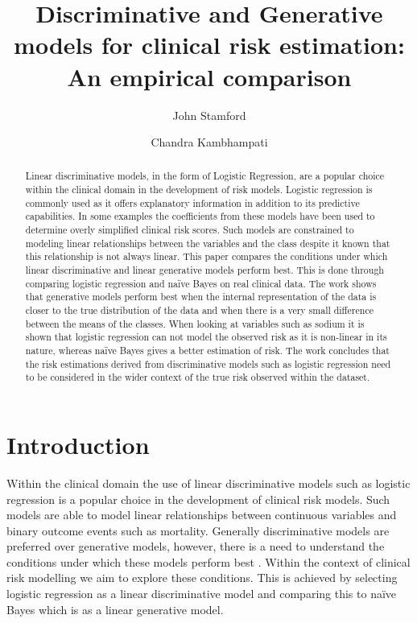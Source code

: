\documentclass[a4paper,UKenglish]{oasics-v2016}
\title{Discriminative and Generative models for clinical risk estimation: An empirical comparison}
\author[1]{John Stamford}
\author[2]{Chandra Kambhampati}
\affil[1]{Department of Computer Science, The University of Hull, Kingston upon Hull, HU6 7RX\\
\texttt{j.stamford@2014.hull.ac.uk}}
\affil[2]{Department of Computer Science, The University of Hull, Kingston upon Hull, HU6 7RX\\
\texttt{c.kambhampati@hull.ac.uk}}
\begin{document}
\maketitle

\begin{abstract}
Linear discriminative models, in the form of Logistic Regression, are a popular choice within the clinical domain in the development of risk models. Logistic regression is commonly used as it offers explanatory information in addition to its predictive capabilities. In some examples the coefficients from these models have been used to determine overly simplified clinical risk scores. Such models are constrained to modeling linear relationships between the variables and the class despite it known that this relationship is not always linear. This paper compares the conditions under which linear discriminative and linear generative models perform best. This is done through comparing logistic regression and naïve Bayes on real clinical data. The work shows that generative models perform best when the internal representation of the data is closer to the true distribution of the data and when there is a very small difference between the means of the classes. When looking at variables such as sodium it is shown that logistic regression can not model the observed risk as it is non-linear in its nature, whereas naïve Bayes gives a better estimation of risk. The work concludes that the risk estimations derived from discriminative models such as logistic regression need to be considered in the wider context of the true risk observed within the dataset.
 \end{abstract}



\section{Introduction}
Within the clinical domain the use of linear discriminative models such as logistic regression is a popular choice in the development of clinical risk models. Such models are able to model linear relationships between continuous variables and binary outcome events such as mortality. Generally discriminative models are preferred over generative models, however, there is a need to understand the conditions under which these models perform best \cite{Ng2002}. Within the context of clinical risk modelling we aim to explore these conditions. This is achieved by selecting logistic regression as a linear discriminative model and comparing this to naïve Bayes which is as a linear generative model.
\end{document}
